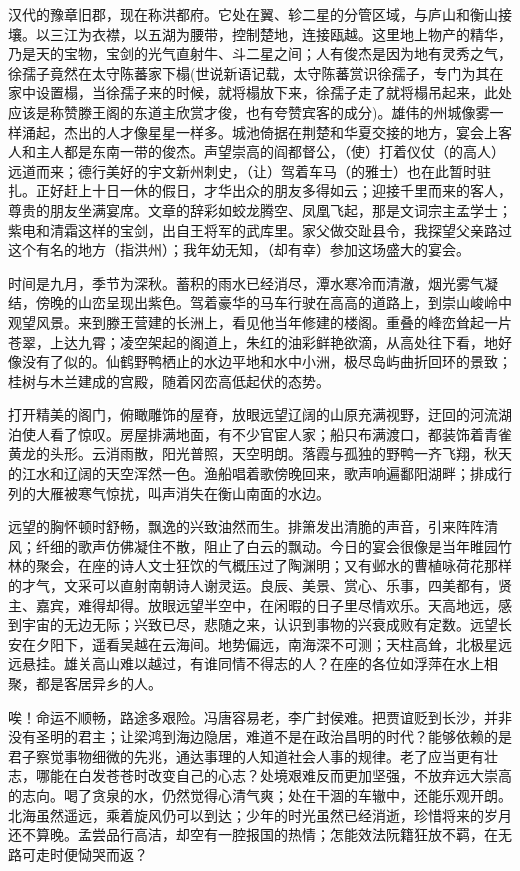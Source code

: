 \documentclass[12pt,UTF-8,openany]{ctexbook}
\begin{document}
\begin{normalsize}
    
    汉代的豫章旧郡，现在称洪都府。它处在翼、轸二星的分管区域，与庐山和衡山接壤。以三江为衣襟，以五湖为腰带，控制楚地，连接瓯越。这里地上物产的精华，乃是天的宝物，宝剑的光气直射牛、斗二星之间；人有俊杰是因为地有灵秀之气，徐孺子竟然在太守陈蕃家下榻(世说新语记载，太守陈蕃赏识徐孺子，专门为其在家中设置榻，当徐孺子来的时候，就将榻放下来，徐孺子走了就将榻吊起来，此处应该是称赞滕王阁的东道主欣赏才俊，也有夸赞宾客的成分)。雄伟的州城像雾一样涌起，杰出的人才像星星一样多。城池倚据在荆楚和华夏交接的地方，宴会上客人和主人都是东南一带的俊杰。声望崇高的阎都督公，（使）打着仪仗（的高人）远道而来；德行美好的宇文新州刺史，（让）驾着车马（的雅士）也在此暂时驻扎。正好赶上十日一休的假日，才华出众的朋友多得如云；迎接千里而来的客人，尊贵的朋友坐满宴席。文章的辞彩如蛟龙腾空、凤凰飞起，那是文词宗主孟学士；紫电和清霜这样的宝剑，出自王将军的武库里。家父做交趾县令，我探望父亲路过这个有名的地方（指洪州）；我年幼无知，（却有幸）参加这场盛大的宴会。
    
    时间是九月，季节为深秋。蓄积的雨水已经消尽，潭水寒冷而清澈，烟光雾气凝结，傍晚的山峦呈现出紫色。驾着豪华的马车行驶在高高的道路上，到崇山峻岭中观望风景。来到滕王营建的长洲上，看见他当年修建的楼阁。重叠的峰峦耸起一片苍翠，上达九霄；凌空架起的阁道上，朱红的油彩鲜艳欲滴，从高处往下看，地好像没有了似的。仙鹤野鸭栖止的水边平地和水中小洲，极尽岛屿曲折回环的景致；桂树与木兰建成的宫殿，随着冈峦高低起伏的态势。
    
    打开精美的阁门，俯瞰雕饰的屋脊，放眼远望辽阔的山原充满视野，迂回的河流湖泊使人看了惊叹。房屋排满地面，有不少官宦人家；船只布满渡口，都装饰着青雀黄龙的头形。云消雨散，阳光普照，天空明朗。落霞与孤独的野鸭一齐飞翔，秋天的江水和辽阔的天空浑然一色。渔船唱着歌傍晚回来，歌声响遍鄱阳湖畔；排成行列的大雁被寒气惊扰，叫声消失在衡山南面的水边。
    
    远望的胸怀顿时舒畅，飘逸的兴致油然而生。排箫发出清脆的声音，引来阵阵清风；纤细的歌声仿佛凝住不散，阻止了白云的飘动。今日的宴会很像是当年睢园竹林的聚会，在座的诗人文士狂饮的气概压过了陶渊明；又有邺水的曹植咏荷花那样的才气，文采可以直射南朝诗人谢灵运。良辰、美景、赏心、乐事，四美都有，贤主、嘉宾，难得却得。放眼远望半空中，在闲暇的日子里尽情欢乐。天高地远，感到宇宙的无边无际；兴致已尽，悲随之来，认识到事物的兴衰成败有定数。远望长安在夕阳下，遥看吴越在云海间。地势偏远，南海深不可测；天柱高耸，北极星远远悬挂。雄关高山难以越过，有谁同情不得志的人？在座的各位如浮萍在水上相聚，都是客居异乡的人。
    
    唉！命运不顺畅，路途多艰险。冯唐容易老，李广封侯难。把贾谊贬到长沙，并非没有圣明的君主；让梁鸿到海边隐居，难道不是在政治昌明的时代？能够依赖的是君子察觉事物细微的先兆，通达事理的人知道社会人事的规律。老了应当更有壮志，哪能在白发苍苍时改变自己的心志？处境艰难反而更加坚强，不放弃远大崇高的志向。喝了贪泉的水，仍然觉得心清气爽；处在干涸的车辙中，还能乐观开朗。北海虽然遥远，乘着旋风仍可以到达；少年的时光虽然已经消逝，珍惜将来的岁月还不算晚。孟尝品行高洁，却空有一腔报国的热情；怎能效法阮籍狂放不羁，在无路可走时便恸哭而返？
    

\end{normalsize}
\end{document}
